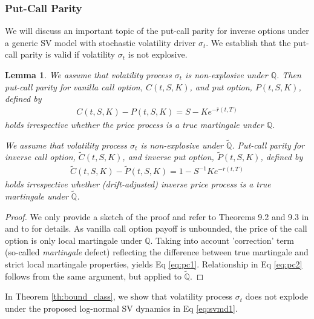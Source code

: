 \documentclass[pdftex,11pt,a4paper] {article}
\newtheorem{lemma}{Lemma}[section]
\begin{document}
\subsubsection{Put-Call Parity}
We will discuss an important topic of the put-call parity for inverse options under a generic SV model with stochastic volatility driver $\sigma_{t}$. We establish that the put-call parity is valid if volatility $\sigma_{t}$ is not explosive.
\begin{lemma}\label{lem:put_call}
We assume that volatility process $\sigma_t$ is non-explosive under $\mathbb{Q}$. Then put-call parity for vanilla call option, $C(t, S, K)$, and put option, $P(t, S, K)$, defined by
\begin{equation} \label{eq:pc1}
\begin{split}
C(t, S, K)-P(t, S, K)= S -Ke^{-\bar r(t,T)}
\end{split}
\end{equation}
holds irrespective whether the price process is a true martingale under $\mathbb{Q}$.

We assume that volatility process $\sigma_t$ is non-explosive under $\tilde{\mathbb{Q}}$.  Put-call parity for inverse call option, $\tilde{C}(t, S, K)$, and inverse put option, $\tilde{P}(t, S, K)$, defined by
\begin{equation} \label{eq:pc2}
\begin{split}
\tilde{C}(t, S, K)-\tilde{P}(t, S, K)= 1-S^{-1}Ke^{-\bar r(t,T)}
\end{split}
\end{equation}
holds irrespective whether (drift-adjusted) inverse price process is a true martingale under $\tilde{\mathbb{Q}}$.
\end{lemma}

\begin{proof}
We only provide a sketch of the proof and refer to Theorems 9.2 and 9.3 in \cite{Lewis2000} and to \cite{Sin1998} for details.
As vanilla call option payoff is unbounded, the price of the call option is only local martingale under $\mathbb{Q}$. Taking into account 'correction' term (so-called {\it martingale} defect) reflecting the difference between true martingale and strict local martingale properties, yields Eq \eqref{eq:pc1}. Relationship in Eq \eqref{eq:pc2} follows from the same argument, but applied to $\tilde{\mathbb{Q}}$. 
\end{proof}

In Theorem \ref{th:bound_class}, we show that volatility process $\sigma_t$ does not explode under the proposed log-normal SV dynamics in Eq \eqref{eq:svmd1}.
\end{document}
